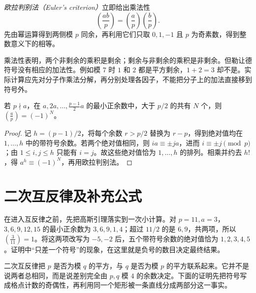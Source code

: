 \emph{欧拉判别法（Euler's criterion）}立即给出乘法性
\[
 \left(\frac{ab}{p}\right)=\left(\frac ap\right)\left(\frac bp\right).
\]
先由幂运算得到两侧模 $p$ 同余，再利用它们只取 $0,1,-1$ 且 $p$ 为奇素数，得到整数意义下的相等。

乘法性表明，两个非剩余的乘积是剩余；剩余与非剩余的乘积是非剩余。但勒让德符号没有相应的加法性。例如模 $7$ 时 $1$ 和 $2$ 都是平方剩余，$1+2=3$ 却不是。实际计算应先对分子作乘法分解，再分别处理各因子，不能把分子上的加法直接移到符号外。

\begin{lemma}
\label{lem:gauss}
若 $p\nmid a$，在 $a,2a,\ldots,\frac{p-1}{2}a$ 的最小正余数中，大于 $p/2$ 的共有 $N$ 个，则 $\left(\frac ap\right)=(-1)^N$。
\end{lemma}
\begin{proof}
记 $h=(p-1)/2$，将每个余数 $r>p/2$ 替换为 $r-p$，得到绝对值均在 $1,\ldots,h$ 中的带符号余数。若两个绝对值相同，则 $ia\equiv\pm ja$，进而 $i\equiv\pm j\pmod p$；由 $1\le i,j\le h$ 只能有 $i=j$。故这些绝对值恰为 $1,\ldots,h$ 的排列。相乘并约去 $h!$，得 $a^h\equiv(-1)^N$，再用欧拉判别法。
\end{proof}

\section{二次互反律及补充公式}

在进入互反律之前，先把高斯引理落实到一次小计算。对 $p=11,a=3$，$3,6,9,12,15$ 的最小正余数为 $3,6,9,1,4$；超过 $11/2$ 的是 $6,9$，共两项，所以 $\left(\frac3{11}\right)=1$。将这两项改写为 $-5,-2$ 后，五个带符号余数的绝对值恰为 $1,2,3,4,5$。证明中“只差一个符号”的现象，在这里就是负号的数目决定最终结果。

二次互反律把 $p$ 是否为模 $q$ 的平方，与 $q$ 是否为模 $p$ 的平方联系起来。它并不是说两者总相同，而是说差别完全由 $p,q$ 模 $4$ 的余数决定。下面的证明先把符号写成格点计数的奇偶性，再利用同一个矩形被一条直线分成两部分这一事实。

